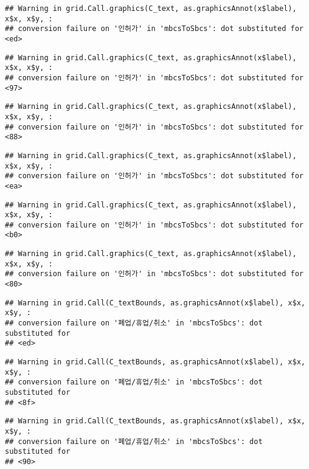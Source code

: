 \documentclass[
]{book}
\begin{document}
\begin{verbatim}
## Warning in grid.Call.graphics(C_text, as.graphicsAnnot(x$label), x$x, x$y, :
## conversion failure on '인허가' in 'mbcsToSbcs': dot substituted for <ed>
\end{verbatim}

\begin{verbatim}
## Warning in grid.Call.graphics(C_text, as.graphicsAnnot(x$label), x$x, x$y, :
## conversion failure on '인허가' in 'mbcsToSbcs': dot substituted for <97>
\end{verbatim}

\begin{verbatim}
## Warning in grid.Call.graphics(C_text, as.graphicsAnnot(x$label), x$x, x$y, :
## conversion failure on '인허가' in 'mbcsToSbcs': dot substituted for <88>
\end{verbatim}

\begin{verbatim}
## Warning in grid.Call.graphics(C_text, as.graphicsAnnot(x$label), x$x, x$y, :
## conversion failure on '인허가' in 'mbcsToSbcs': dot substituted for <ea>
\end{verbatim}

\begin{verbatim}
## Warning in grid.Call.graphics(C_text, as.graphicsAnnot(x$label), x$x, x$y, :
## conversion failure on '인허가' in 'mbcsToSbcs': dot substituted for <b0>
\end{verbatim}

\begin{verbatim}
## Warning in grid.Call.graphics(C_text, as.graphicsAnnot(x$label), x$x, x$y, :
## conversion failure on '인허가' in 'mbcsToSbcs': dot substituted for <80>
\end{verbatim}

\begin{verbatim}
## Warning in grid.Call(C_textBounds, as.graphicsAnnot(x$label), x$x, x$y, :
## conversion failure on '폐업/휴업/취소' in 'mbcsToSbcs': dot substituted for
## <ed>
\end{verbatim}

\begin{verbatim}
## Warning in grid.Call(C_textBounds, as.graphicsAnnot(x$label), x$x, x$y, :
## conversion failure on '폐업/휴업/취소' in 'mbcsToSbcs': dot substituted for
## <8f>
\end{verbatim}

\begin{verbatim}
## Warning in grid.Call(C_textBounds, as.graphicsAnnot(x$label), x$x, x$y, :
## conversion failure on '폐업/휴업/취소' in 'mbcsToSbcs': dot substituted for
## <90>
\end{verbatim}
\end{document}
